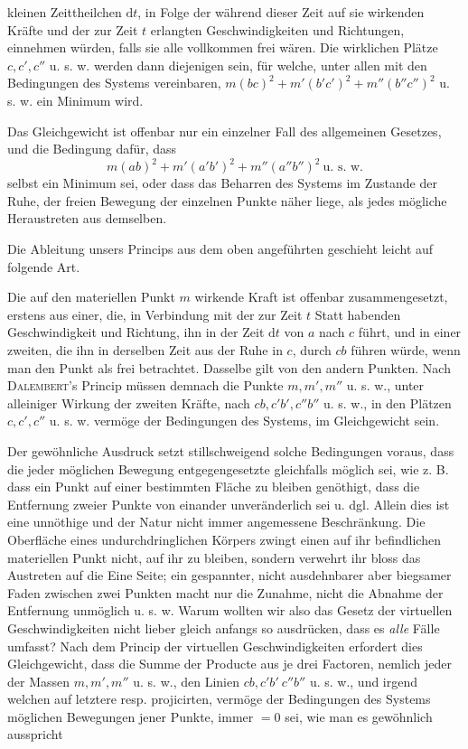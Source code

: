 kleinen Zeittheilchen $\mathrm{d}t$, in Folge der während dieser Zeit auf sie wirkenden Kräfte und der zur Zeit $t$ erlangten Geschwindigkeiten und Richtungen, einnehmen würden, falls sie alle vollkommen frei wären. Die wirklichen Plätze $c,c',c''$ u. s. w. werden dann diejenigen sein, für welche, unter allen mit den Bedingungen des Systems vereinbaren, $m(bc)^2+m'(b'c')^2+m''(b''c'')^2$ u. s. w. ein Minimum wird.

Das Gleichgewicht ist offenbar nur ein einzelner Fall des allgemeinen Gesetzes, und die Bedingung dafür, dass
\[
m(ab)^2+m'(a'b')^2+m''(a''b'')^2\ \text{u. s. w.}
\]
selbst ein Minimum sei, oder dass das Beharren des Systems im Zustande der Ruhe, der freien Bewegung der einzelnen Punkte näher liege, als jedes mögliche Heraustreten aus demselben.

Die Ableitung unsers Princips aus dem oben angeführten geschieht leicht auf folgende Art.

Die auf den materiellen Punkt $m$ wirkende Kraft ist offenbar zusammengesetzt, erstens aus einer, die, in Verbindung mit der zur Zeit $t$ Statt habenden Geschwindigkeit und Richtung, ihn in der Zeit $\mathrm{d}t$ von $a$ nach $c$ führt, und in einer zweiten, die ihn in derselben Zeit aus der Ruhe in $c$, durch $cb$ führen würde, wenn man den Punkt als frei betrachtet. Dasselbe gilt von den andern Punkten. Nach \textsc{Dalembert}’s Princip müssen demnach die Punkte $m,m',m''$ u. s. w., unter alleiniger Wirkung der zweiten Kräfte, nach $cb,c'b',c''b''$ u. s. w., in den Plätzen $c,c',c''$ u. s. w. vermöge der Bedingungen des Systems, im Gleichgewicht sein.

\expandafter\def\csname HistoricalNoteText3\endcsname{Der gewöhnliche Ausdruck setzt stillschweigend solche Bedingungen voraus, dass die jeder möglichen Bewegung entgegengesetzte gleichfalls möglich sei, wie z. B. dass ein Punkt auf einer bestimmten Fläche zu bleiben genöthigt, dass die Entfernung zweier Punkte von einander unveränderlich sei u. dgl. Allein dies ist eine unnöthige und der Natur nicht immer angemessene Beschränkung. Die Oberfläche eines undurchdringlichen Körpers zwingt einen auf ihr befindlichen materiellen Punkt nicht, auf ihr zu bleiben, sondern verwehrt ihr bloss das Austreten auf die Eine Seite; ein gespannter, nicht ausdehnbarer aber biegsamer Faden zwischen zwei Punkten macht nur die Zunahme, nicht die Abnahme der Entfernung unmöglich u. s. w. Warum wollten wir also das Gesetz der virtuellen Geschwindigkeiten nicht lieber gleich anfangs so ausdrücken, dass es \textit{alle} Fälle umfasst?}
Nach dem Princip der virtuellen Geschwindigkeiten erfordert dies Gleichgewicht, dass die Summe der Producte aus je drei Factoren, nemlich jeder der Massen $m,m',m''$ u. s. w., den Linien $cb,c'b'\ c''b''$ u. s. w., und irgend welchen auf letztere resp. projicirten, vermöge der Bedingungen des Systems möglichen Bewegungen jener Punkte, immer $=0$ sei, wie man es gewöhnlich ausspricht
